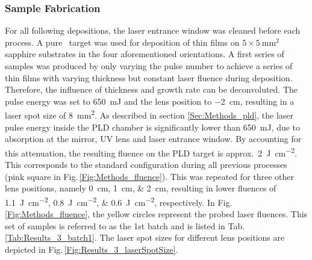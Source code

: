 \subsubsection*{Sample Fabrication}
For all following depositions, the laser entrance window was cleaned before each process.
A pure \cro\ target was used for deposition of thin films on $5\times\qty{5}{\mm\squared}$ sapphire substrates in the four aforementioned orientations.
A first series of samples was produced by only varying the pulse number to achieve a series of thin films with varying thickness but constant laser fluence during deposition.
Therefore, the influence of thickness and growth rate can be deconvoluted.
The pulse energy was set to \qty{650}{\milli\joule} and the lens position to \qty{-2}{\cm}, resulting in a laser spot size of \qty{8}{\mm\squared}.
As described in section \ref{Sec:Methods_pld}, the laser pulse energy inside the PLD chamber is significantly lower than \qty{650}{\milli\joule}, due to absorption at the mirror, UV lens and laser entrance window.
By accounting for this attenuation, the resulting fluence on the PLD target is approx.\ \qty{2}{\joule\per\cm\squared}.
This corresponds to the standard configuration during all previous processes (pink square in Fig.\,\ref{Fig:Methods_fluence}).
This was repeated for three other lens positions, namely \qtylist{0;1;2}{\cm}, resulting in lower fluences of \qtylist{1.1;0.8;0.6}{\J\per\cm\squared}, respectively.
In Fig.\,\ref{Fig:Methods_fluence}, the yellow circles represent the probed laser fluences.
This set of samples is referred to as the 1st batch and is listed in Tab.\,\ref{Tab:Results_3_batch1}.
The laser spot sizes for different lens positions are depicted in Fig.\,\ref{Fig:Results_3_laserSpotSize}.

